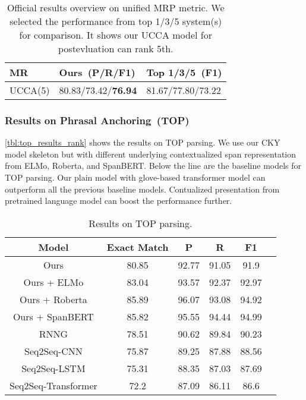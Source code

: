 \begin{table}[!tbp]
\caption{\label{tbl:ucca_results_rank} Official results overview on
  unified MRP metric. We selected the performance from top 1/3/5
  system(s) for comparison. It shows our UCCA model for postevluation
  can rank 5th.}
  \small
\begin{center}
\begin{tabular}{lll}
\toprule
\hline
MR     & Ours~(P/R/F1) & Top 1/3/5~(F1)  \\ \hline
UCCA(5)   & 80.83/73.42/\textbf{76.94}   & 81.67/77.80/73.22 \\ \hline
\bottomrule
\end{tabular}
\end{center}
\end{table}


\subsubsection{Results on Phrasal Anchoring~(TOP)}
\label{sssec:lex-phr:top-results}
\autoref{tbl:top_results_rank} shows the results on TOP parsing. We
use our CKY model skeleton but with different underlying
contextualized span representation from ELMo, Roberta, and
SpanBERT. Below the line are the baseline models for TOP parsing. Our
plain model with glove-based transformer model can outperform all the
previous baseline models. Contualized presentation from pretrained
language model can boost the performance further.

\begin{table}[!tbp]
\caption{\label{tbl:top_results_rank} Results on TOP parsing.}
\begin{center}
\begin{tabular}{cccccc}
  \toprule
  \hline
  Model           & Exact Match & P     & R     & F1    \\ \hline
  Ours            & 80.85       & 92.77 & 91.05 & 91.9  \\
  Ours + ELMo     & 83.04       & 93.57 & 92.37 & 92.97 \\
  Ours + Roberta  & 85.89       & 96.07 & 93.08 & 94.92 \\
  Ours + SpanBERT & 85.82       & 95.55 & 94.44 & 94.99 \\ \hline
  RNNG                & 78.51       & 90.62 & 89.84 & 90.23 \\
  Seq2Seq-CNN         & 75.87       & 89.25 & 87.88 & 88.56 \\
  Seq2Seq-LSTM        & 75.31       & 88.35 & 87.03 & 87.69 \\
  Seq2Seq-Transformer & 72.2        & 87.09 & 86.11 & 86.6  \\ \hline
  \bottomrule
\end{tabular}
\end{center}
\end{table}

